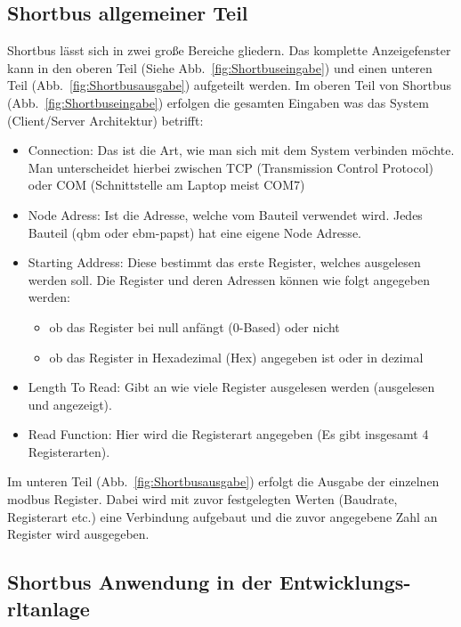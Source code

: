 \subsection{Shortbus allgemeiner Teil}
Shortbus lässt sich in zwei große Bereiche gliedern. Das komplette Anzeigefenster kann in den oberen Teil (Siehe Abb.~\ref{fig:Shortbuseingabe}) und einen unteren Teil (Abb.~\ref{fig:Shortbusausgabe}) aufgeteilt werden.
Im oberen Teil von Shortbus (Abb.~\ref{fig:Shortbuseingabe}) erfolgen die gesamten Eingaben was das System (Client/Server Architektur) betrifft:
\begin{itemize}
	\item Connection: Das ist die Art, wie man sich mit dem System verbinden möchte. Man unterscheidet hierbei zwischen TCP (Transmission Control Protocol) oder COM (Schnittstelle am Laptop meist COM7)
	
	\item Node Adress: Ist die Adresse, welche vom Bauteil verwendet wird. Jedes Bauteil (\zB \gls{qbm}  oder ebm-papst) hat eine eigene Node Adresse.
	
	\item Starting Address: Diese bestimmt das erste Register, welches ausgelesen werden soll. Die Register und deren Adressen können wie folgt angegeben werden:
		\begin{itemize}
			\item ob das Register bei null anfängt (0-Based) oder nicht
			\item ob das Register in Hexadezimal (Hex) angegeben ist oder in dezimal
		\end{itemize}
	\item Length To Read: Gibt an wie viele Register ausgelesen werden (ausgelesen und angezeigt).
	\item Read Function: Hier wird die Registerart angegeben (Es gibt insgesamt 4 Registerarten).
\end{itemize}

Im unteren Teil (Abb.~\ref{fig:Shortbusausgabe}) erfolgt die Ausgabe der einzelnen \gls{modbus} Register. Dabei wird mit zuvor festgelegten Werten (Baudrate, Registerart etc.) eine Verbindung aufgebaut und die zuvor angegebene Zahl an Register wird ausgegeben. 


  
\newpage
\subsection{Shortbus Anwendung in der Entwicklungs- \ac{rltanlage}}

